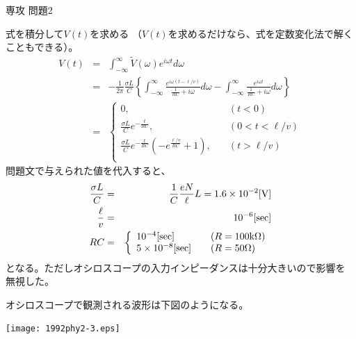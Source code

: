 \documentclass[fleqn]{jbook}
\begin{document}
\begin{answer}{専攻 問題2}{}
\begin{subanswers}
\SubAnswer

式を積分して$V(t)$を求める
（$V(t)$を求めるだけなら、式を定数変化法で解くこともできる）。
\begin{eqnarray*}
V(t)&=&\int_{-\infty}^{\infty}\tilde{V}(\omega)e^{i\omega t}d\omega\\
&=&-\frac{1}{2\pi}\frac{\sigma L}{C}\left\{\int_{-\infty}^{\infty}\frac
{e^{i\omega(t-\ell /v)}}{\frac{1}{RC}+i\omega}d\omega-\int_{-\infty}^{\infty}
\frac{e^{i\omega t}}{\frac{1}{RC}+i\omega}d\omega\right\}\\
&=&\left\{
\begin{array}{ll}
0,& \quad (t<0)\\
\frac{\sigma L}{C}e^{-\frac{t}{RC}},& \quad (0<t<\ell /v)\\
\frac{\sigma L}{C}e^{-\frac{t}{RC}}(-e^{\frac{\ell /v}{RC}}+1),& \quad (t>\ell /v)\\
\end{array}\right.
\end{eqnarray*}
問題文で与えられた値を代入すると、
\begin{eqnarray*}
\frac{\sigma L}{C}&=&\frac{1}{C}\frac{eN}{\ell}L=1.6\times 10^{-2}[{\rm V}]\\
\frac{\ell}{v}&=&10^{-6}[{\rm sec}]\\
RC&=&\left\{
\begin{array}{ll}
10^{-4}[{\rm sec}]& \quad (R=100{\rm k}\Omega)\\
5\times 10^{-8}[{\rm sec}]& \quad (R=50\Omega)\\
\end{array} \right.
\end{eqnarray*}
となる。ただしオシロスコープの入力インピーダンスは十分大きいので影響を
無視した。

オシロスコープで観測される波形は下図のようになる。
\begin{center}
\texttt{[image: 1992phy2-3.eps]}
\end{center}
\end{subanswers}
\end{answer}
\end{document}
